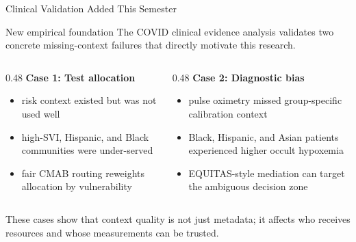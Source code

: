 \documentclass[aspectratio=169,10pt]{beamer}
\begin{document}
\begin{frame}{Clinical Validation Added This Semester}
\begin{block}{New empirical foundation}
The COVID clinical evidence analysis validates two concrete missing-context failures that directly motivate this research.
\end{block}

\begin{columns}[T]
\begin{column}{0.48\textwidth}
\textbf{Case 1: Test allocation}
\begin{itemize}
    \item risk context existed but was not used well
    \item high-SVI, Hispanic, and Black communities were under-served
    \item fair CMAB routing reweights allocation by vulnerability
\end{itemize}
\end{column}
\begin{column}{0.48\textwidth}
\textbf{Case 2: Diagnostic bias}
\begin{itemize}
    \item pulse oximetry missed group-specific calibration context
    \item Black, Hispanic, and Asian patients experienced higher occult hypoxemia
    \item EQUITAS-style mediation can target the ambiguous decision zone
\end{itemize}
\end{column}
\end{columns}

\vspace{0.4em}
\small These cases show that context quality is not just metadata; it affects who receives resources and whose measurements can be trusted.
\end{frame}
\end{document}
